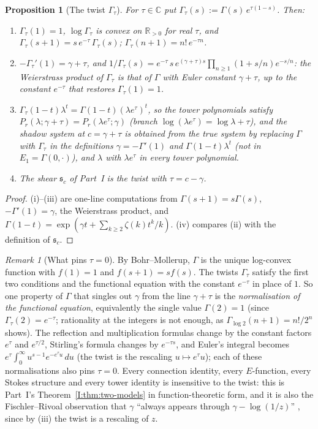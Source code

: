 \documentclass[11pt,a4paper]{article}
\newcommand{\R}{\mathbb R}
\newcommand{\C}{\mathbb C}
\newcommand{\shear}{\mathfrak s}
\newtheorem{proposition}[theorem]{Proposition}
\theoremstyle{definition}
\theoremstyle{remark}
\newtheorem{remark}[theorem]{Remark}
\numberwithin{equation}{section}
\begin{document}
\begin{proposition}[The twist $\Gamma_\tau$]\label{IV:prop:twist}
For $\tau\in\C$ put $\Gamma_\tau(s):=\Gamma(s)\,e^{\tau(1-s)}$. Then:
\begin{enumerate}[label=(\roman*)]
\item $\Gamma_\tau(1)=1$, $\log\Gamma_\tau$ is convex on $\R_{>0}$ for real $\tau$, and
$\Gamma_\tau(s+1)=s\,e^{-\tau}\,\Gamma_\tau(s)$; $\Gamma_\tau(n+1)=n!\,e^{-\tau n}$.
\item $-\Gamma_\tau'(1)=\gamma+\tau$, and
$1/\Gamma_\tau(s)=e^{-\tau}\,s\,e^{(\gamma+\tau)s}\prod_{n\ge1}(1+s/n)e^{-s/n}$: the
Weierstrass product of $\Gamma_\tau$ is that of $\Gamma$ with Euler constant $\gamma+\tau$,
up to the constant $e^{-\tau}$ that restores $\Gamma_\tau(1)=1$.
\item $\Gamma_\tau(1-t)\lambda^t=\Gamma(1-t)(\lambda e^{\tau})^t$, so the tower polynomials
satisfy $P_r(\lambda;\gamma+\tau)=P_r(\lambda e^\tau;\gamma)$ (branch
$\log(\lambda e^\tau)=\log\lambda+\tau$), and the shadow system at $c=\gamma+\tau$ is
obtained from the true system by replacing $\Gamma$ with $\Gamma_\tau$ in the definitions
$\gamma=-\Gamma'(1)$ and $\Gamma(1-t)\lambda^t$ (not in $E_1=\Gamma(0,\cdot)$), and $\lambda$
with $\lambda e^\tau$ in every tower polynomial.
\item The shear $\shear_c$ of Part~I is the twist with $\tau=c-\gamma$.
\end{enumerate}
\end{proposition}
\begin{proof}
(i)--(iii) are one-line computations from $\Gamma(s+1)=s\Gamma(s)$, $-\Gamma'(1)=\gamma$,
the Weierstrass product, and $\Gamma(1-t)=\exp(\gamma t+\sum_{k\ge2}\zeta(k)t^k/k)$. (iv)
compares (ii) with the definition of $\shear_c$.
\end{proof}

\begin{remark}[What pins $\tau=0$]\label{IV:rem:bohr}
By Bohr--Mollerup, $\Gamma$ is the unique log-convex function with $f(1)=1$ and
$f(s+1)=sf(s)$. The twists $\Gamma_\tau$ satisfy the first two conditions and the
functional equation with the constant $e^{-\tau}$ in place of $1$. So one property of
$\Gamma$ that singles out $\gamma$ from the line $\gamma+\tau$ is the \emph{normalisation of
the functional equation}, equivalently the single value $\Gamma(2)=1$ (since
$\Gamma_\tau(2)=e^{-\tau}$; rationality at the integers is not enough, as
$\Gamma_{\log2}(n+1)=n!/2^n$ shows). The reflection and multiplication formulas change by
the constant factors $e^{\tau}$ and $e^{\tau/2}$, Stirling's formula changes by $e^{-\tau s}$,
and Euler's integral becomes $e^{\tau}\int_0^\infty u^{s-1}e^{-e^{\tau}u}\,du$ (the twist is
the rescaling $u\mapsto e^\tau u$); each of these normalisations also pins $\tau=0$. Every
connection identity, every $E$-function, every
Stokes structure and every tower identity is insensitive to the twist: this is
Part~I's Theorem~\ref{I:thm:two-models} in function-theoretic form, and it is also the Fischler--Rivoal
observation that $\gamma$ ``always appears through $\gamma-\log(1/z)$'' \cite{FR2016},
since by (iii) the twist is a rescaling of $z$.
\end{remark}
\end{document}
